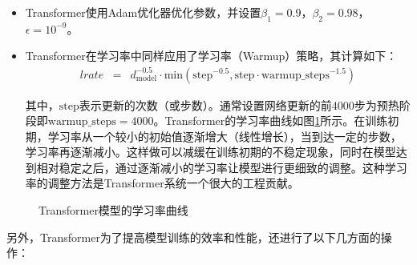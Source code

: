 \begin{itemize}
\vspace{0.5em}
\item	Transformer使用Adam优化器优化参数，并设置$\beta_1=0.9$，$\beta_2=0.98$，$\epsilon=10^{-9}$。
\item Transformer在学习率中同样应用了学习率{\small{}}（Warmup）策略，其计算如下：
\begin{eqnarray}
lrate &=& d_{\textrm{model}}^{-0.5} \cdot \textrm{min} (\textrm{step}^{-0.5} , \textrm{step} \cdot \textrm{warmup\_steps}^{-1.5})
\label{eq:12-15}
\end{eqnarray}

\vspace{0.5em}
其中，$\textrm{step}$表示更新的次数（或步数）。通常设置网络更新的前4000步为预热阶段即$\textrm{warmup\_steps}=4000$。Transformer的学习率曲线如图\ref{fig:12-17}所示。在训练初期，学习率从一个较小的初始值逐渐增大（线性增长），当到达一定的步数，学习率再逐渐减小。这样做可以减缓在训练初期的不稳定现象，同时在模型达到相对稳定之后，通过逐渐减小的学习率让模型进行更细致的调整。这种学习率的调整方法是Transformer系统一个很大的工程贡献。
\vspace{0.5em}
\end{itemize}

\begin{figure}[htp]
\centering

\caption{Transformer模型的学习率曲线}
\label{fig:12-17}
\end{figure}

\parinterval 另外，Transformer为了提高模型训练的效率和性能，还进行了以下几方面的操作：

